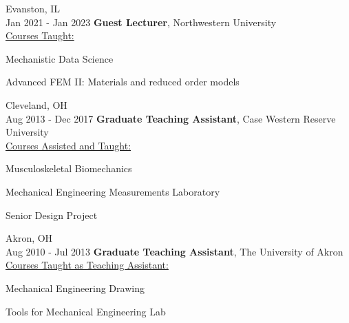 \documentclass[11pt, letterpaper]{article}
\begin{document}
    \begin{twocolentry}{
        Evanston, IL\\
        Jan 2021 - Jan 2023
    }
        \textbf{Guest Lecturer}, Northwestern University\\
        \uline{Courses Taught:} 
            \begin{highlightsforbulletentries}
                \item Mechanistic Data Science
                \item Advanced FEM II: Materials and reduced order models
            \end{highlightsforbulletentries}
    \end{twocolentry}
    \vspace{5 pt}

    \begin{twocolentry}{
        Cleveland, OH\\
        Aug 2013 - Dec 2017
    }
        \textbf{Graduate Teaching Assistant}, Case Western Reserve University\\
        \uline{Courses Assisted and Taught:} 
            \begin{highlightsforbulletentries}
                \item Musculoskeletal Biomechanics
                \item Mechanical Engineering Measurements Laboratory
                \item Senior Design Project
            \end{highlightsforbulletentries}
    \end{twocolentry}
    \vspace{5 pt}

    \begin{twocolentry}{
        Akron, OH\\
        Aug 2010 - Jul 2013
    }
        \textbf{Graduate Teaching Assistant}, The University of Akron\\
        \uline{Courses Taught as Teaching Assistant:} 
            \begin{highlightsforbulletentries}
                \item Mechanical Engineering Drawing
                \item Tools for Mechanical Engineering Lab
            \end{highlightsforbulletentries}
    \end{twocolentry}
    \vspace{5 pt}
\end{document}

